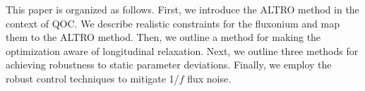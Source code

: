 This paper is organized as follows. 
First, we introduce the ALTRO method in the context of QOC.
We describe realistic constraints for the fluxonium and
map them to the ALTRO method. Then, we
outline a method for making the optimization aware of longitudinal
relaxation. Next, we outline three methods for achieving
robustness to static parameter deviations. Finally,
we employ the robust control techniques to mitigate 1/$f$ flux noise.
